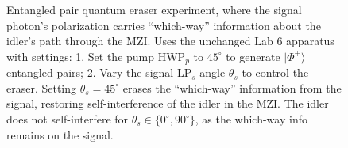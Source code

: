\begin{figure}[htbp]
{
}%
\caption{
Entangled pair quantum eraser experiment, where the signal photon's
polarization carries ``which-way'' information
about the idler's path through the MZI.
Uses the unchanged Lab 6 apparatus with settings:
1. Set the pump HWP$_p$ to $45^\circ$ to generate $|\Phi^+\rangle$ entangled pairs;
2. Vary the signal LP$_s$ angle $\theta_s$ to control the eraser.
Setting $\theta_s = 45^\circ$ erases the ``which-way'' information from the signal,
restoring self-interference of the idler in the MZI.
The idler does not self-interfere 
for $\theta_s \in \{0^\circ, 90^\circ\}$, as the which-way info remains on the signal.
\label{fig:apparatus}
}
\end{figure}
